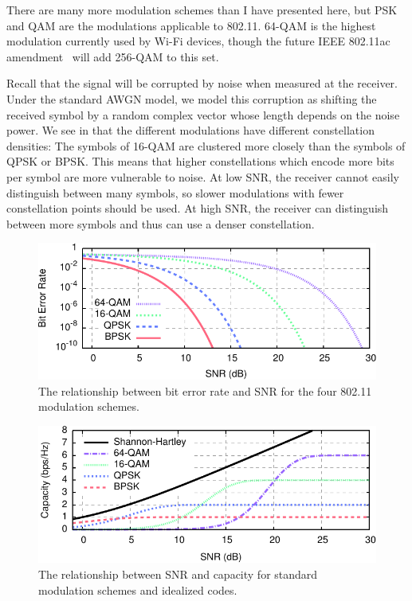 There are many more modulation schemes than I have presented here, but PSK and QAM are the modulations applicable to 802.11.
64-QAM is the highest modulation currently used by Wi-Fi devices, though the future IEEE 802.11ac amendment~\cite{80211ac} will add 256-QAM to this set.

Recall that the signal will be corrupted by noise when measured at the receiver. Under the standard AWGN model, we model this corruption as shifting the received symbol by a random complex vector whose length depends on the noise power. We see in  that the different modulations have different constellation densities: The symbols of 16-QAM are clustered more closely than the symbols of QPSK or BPSK. This means that higher constellations which encode more bits per symbol are more vulnerable to noise. At low SNR, the receiver cannot easily distinguish between many symbols, so slower modulations with fewer constellation points should be used. At high SNR, the receiver can distinguish between more symbols and thus can use a denser constellation.

\begin{figure}[t]
\centering
\includegraphics{figures/background/snr_ber.pdf}
\caption[BER vs SNR for the four 802.11n modulation schemes]{\label{fig:mod_ber_snr}The relationship between bit error rate and SNR for the four 802.11 modulation schemes.}
\end{figure}

\begin{figure}[t]
\centering
\includegraphics{figures/background/snr_bits.pdf}
\caption[Capacity vs SNR for 802.11n modulation and coding schemes]{\label{fig:mod_bits_snr}The relationship between SNR and capacity for standard modulation schemes and idealized codes.}
\end{figure}

